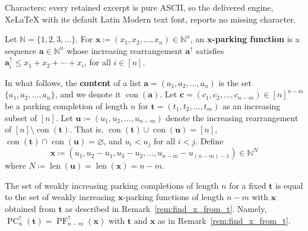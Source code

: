 \documentclass[10pt,a4paper]{amsart}
\newcommand{\PC}{\operatorname{PC}} %
\newcommand{\PF}{\operatorname{PF}} %
\begin{document}
Characters: every retained excerpt is pure ASCII, so the delivered engine, XeLaTeX with its default Latin Modern text font, reports no missing character.
\begin{definition}\label{def:x_parking_function}
    Let $\mathbb{N}=\{1,2,3,\ldots\}$. For $\mathbf{x} \coloneqq (x_1, x_2, \hdots, x_n) \in \mathbb{N}^n$, an \textbf{$\mathbf{x}$-parking function} is a sequence $\mathbf{a} \in\mathbb{N}^n$ whose increasing rearrangement $\mathbf{a}^\uparrow$ satisfies $\mathbf{a}_i^\uparrow \leq x_1 + x_2 + \cdots + x_i$, for all $i\in[n]$.
\end{definition} 

\begin{remark}\label{rem:find_x_from_t}
    In what follows, the \textbf{content} of a list $\mathbf{a} = (a_1, a_2, \hdots, a_n)$ is the set $\{a_1,a_2,\ldots,a_n\}$, and we denote it $\operatorname{con}(\mathbf{a})$.
    Let $\mathbf{c} = (c_1, c_2, \hdots, c_{n-m}) \in [n]^{n-m}$ be a parking completion of length $n$ for $\mathbf{t} = (t_1, t_2, \hdots, t_m)$ as an increasing subset of $[n]$.
    Let $\mathbf{u} \coloneqq (u_1, u_2, \hdots, u_{n-m})$ denote the increasing rearrangement of $[n] \setminus \operatorname{con}(\mathbf{t})$.
    That is, $\operatorname{con}(\mathbf{t}) \cup \operatorname{con}(\mathbf{u}) = [n]$, $\operatorname{con}(\mathbf{t}) \cap \operatorname{con}(\mathbf{u}) = \varnothing$, and $u_i < u_j$ for all $i < j$.    
    Define 
    \[
    \mathbf{x} \coloneqq (u_1, u_2 - u_1, u_3 - u_2, \hdots, u_{n-m} - u_{(n-m)-1}) \in \mathbb{N}^{N}
    \]
    where $N \coloneqq \operatorname{len}(\mathbf{u}) = \operatorname{len}(\mathbf{x}) = n-m$.
\end{remark}

\begin{proposition}\label{prop:weakly_increasing_sets_are_equal}
    The set of weakly increasing parking completions of length $n$ for a fixed $\mathbf{t}$ is equal to the set of weakly increasing $\mathbf{x}$-parking functions of length $n-m$ with $\mathbf{x}$ obtained from $\mathbf{t}$ as described in Remark~\ref{rem:find_x_from_t}.
    Namely, $\PC_{n}^\uparrow(\mathbf{t}) = \PF_{n-m}^\uparrow(\mathbf{x})$ with $\mathbf{t}$ and $\mathbf{x}$ as in Remark~\ref{rem:find_x_from_t}.
\end{proposition}
\end{document}
